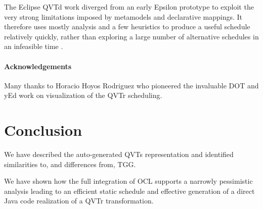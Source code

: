 \documentclass{llncs}
\begin{document}
The Eclipse QVTd work diverged from an early Epsilon prototype to exploit the very strong limitations imposed by metamodels and declarative mappings. It therefore uses mostly analysis and a few heuristics to produce a useful schedule relatively quickly, rather than exploring a large number of alternative schedules in an infeasible time \cite{Horacio-planning}.

\paragraph{Acknowledgements}

Many thanks to Horacio Hoyos Rodriguez who pioneered the invaluable DOT and yEd work on visualization of the QVTr scheduling.

\section{Conclusion}\label{Conclusion}

We have described the auto-generated QVTs representation and identified similarities to, and differences from, TGG.

We have shown how the full integration of OCL supports a narrowly pessimistic analysis leading to an efficient static schedule and effective generation of a direct Java code realization of a QVTr transformation. 
\end{document}
